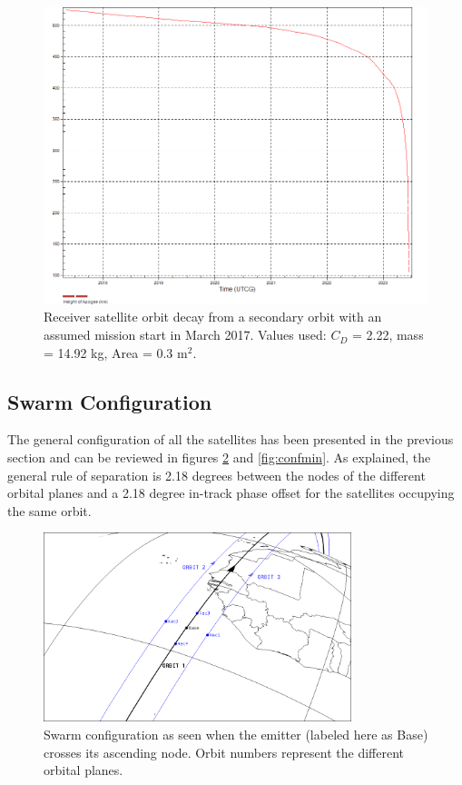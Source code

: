 \begin{landscape}
\begin{figure}[ht!]
\centering
\includegraphics[width = \textheight]{chapters/img/receiverDecay2nd.png}
\caption{Receiver satellite orbit decay from a secondary orbit with an assumed mission start in March 2017. Values used: $C_D$ = 2.22, mass = 14.92 kg, Area = 0.3 m$^2$.}
\label{fig:recLife}
\end{figure}
\end{landscape}

\subsection{Swarm Configuration}
\label{frSSSC}

The general configuration of all the satellites has been presented in the previous section and can be reviewed in figures \ref{fig:confmax} and \ref{fig:confmin}. As explained, the general rule of separation is 2.18 degrees between the nodes of the different orbital planes and a 2.18 degree in-track phase offset for the satellites occupying the same orbit. 

\begin{figure}[!h]
\centering
\includegraphics[width=0.8\textwidth, angle=0]{chapters/img/primaryconfmax.png}
\caption{Swarm configuration as seen when the emitter (labeled here as Base) crosses its ascending node. Orbit numbers represent the different orbital planes.}
\label{fig:confmax}
\end{figure}

